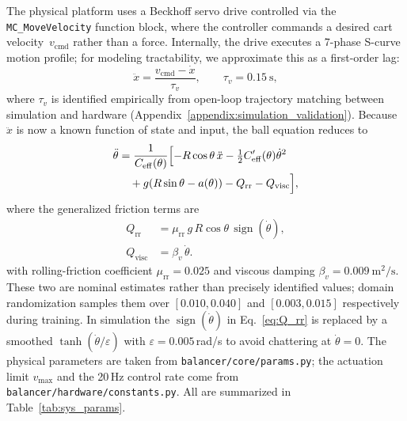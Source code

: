 The physical platform uses a Beckhoff servo drive controlled via
the \texttt{MC\_MoveVelocity} function block, where the controller
commands a desired cart velocity~$v_\text{cmd}$ rather than a force.
Internally, the drive executes a 7-phase S-curve motion profile;
for modeling tractability, we approximate this as a first-order lag:
\begin{equation}
\ddot{x} = \frac{v_\text{cmd} - \dot{x}}{\tau_v},
\qquad \tau_v = 0.15~\text{s},
\label{eq:velocity_lag}
\end{equation}
where $\tau_v$ is identified empirically from open-loop
trajectory matching between simulation and hardware
(Appendix~\ref{appendix:simulation_validation}).
Because $\ddot{x}$ is now a known function of state and input,
the ball equation reduces to
\begin{equation}
\begin{split}
\ddot{\theta} &= \frac{1}{C_{\mathrm{eff}}(\theta)}\Bigl[
  -R\cos\theta\,\ddot{x}
  - \tfrac{1}{2}C_{\mathrm{eff}}'(\theta)\dot{\theta}^2 \\
  &\quad + g(R\sin\theta - a(\theta))
  - Q_\mathrm{rr} - Q_\mathrm{visc}
\Bigr],
\end{split}
\label{eq:ball_reduced}
\end{equation}
where the generalized friction terms are
\begin{align}
Q_\mathrm{rr}   &= \mu_\mathrm{rr}\, g\, R\cos\theta\,
                    \operatorname{sign}(\dot\theta),
                    \label{eq:Q_rr} \\
Q_\mathrm{visc} &= \beta_v\, \dot\theta.
                    \label{eq:Q_visc}
\end{align}
with rolling-friction coefficient
$\mu_\mathrm{rr} = 0.025$ and viscous damping
$\beta_v = 0.009~\text{m}^2/\text{s}$. These two are nominal estimates
rather than precisely identified values; domain randomization samples
them over $[0.010, 0.040]$ and $[0.003, 0.015]$ respectively during
training. In simulation the $\operatorname{sign}(\dot\theta)$ in
Eq.~\eqref{eq:Q_rr} is replaced by a smoothed
$\tanh(\dot\theta/\varepsilon)$ with $\varepsilon = 0.005$\,rad/s to
avoid chattering at $\dot\theta = 0$.
The physical parameters are taken from \texttt{balancer/core/params.py};
the actuation limit $v_\mathrm{max}$ and the 20\,Hz control rate come from
\texttt{balancer/hardware/constants.py}. All are summarized in
Table~\ref{tab:sys_params}.

